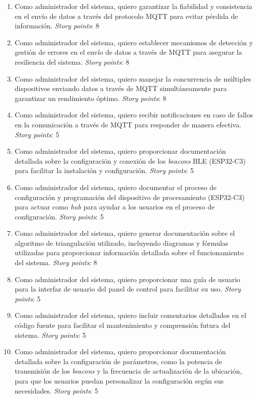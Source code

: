 \documentclass[
11pt, %
]{charter}
\begin{document}
\begin{enumerate}
	\item Como administrador del sistema, quiero garantizar la fiabilidad y consistencia en el envío de datos a través del protocolo MQTT para evitar pérdida de información. \textit{Story points}: 8
	\item Como administrador del sistema, quiero establecer mecanismos de detección y gestión de errores en el envío de datos a través de MQTT para asegurar la resiliencia del sistema. \textit{Story points}: 8
	\item Como administrador del sistema, quiero manejar la concurrencia de múltiples dispositivos enviando datos a través de MQTT simultáneamente para garantizar un rendimiento óptimo. \textit{Story points}: 8
	\item Como administrador del sistema, quiero recibir notificaciones en caso de fallos en la comunicación a través de MQTT para responder de manera efectiva. \textit{Story points}: 5
	\item Como administrador del sistema, quiero proporcionar documentación detallada sobre la configuración y conexión de los \textit{beacons} BLE (ESP32-C3) para facilitar la instalación y configuración. \textit{Story points}: 5
	\item Como administrador del sistema, quiero documentar el proceso de configuración y programación del dispositivo de procesamiento (ESP32-C3) para actuar como \textit{hub} para ayudar a los usuarios en el proceso de configuración. \textit{Story points}: 5
	\item Como administrador del sistema, quiero generar documentación sobre el algoritmo de triangulación utilizado, incluyendo diagramas y fórmulas utilizadas para proporcionar información detallada sobre el funcionamiento del sistema. \textit{Story points}: 8
	\item Como administrador del sistema, quiero proporcionar una guía de usuario para la interfaz de usuario del panel de control para facilitar su uso. \textit{Story points}: 5
	\item Como administrador del sistema, quiero incluir comentarios detallados en el código fuente para facilitar el mantenimiento y comprensión futura del sistema. \textit{Story points}: 5
	\item Como administrador del sistema, quiero proporcionar documentación detallada sobre la configuración de parámetros, como la potencia de transmisión de los \textit{beacons} y la frecuencia de actualización de la ubicación, para que los usuarios puedan personalizar la configuración según sus necesidades. \textit{Story points}: 5

\end{enumerate}
\end{document}
